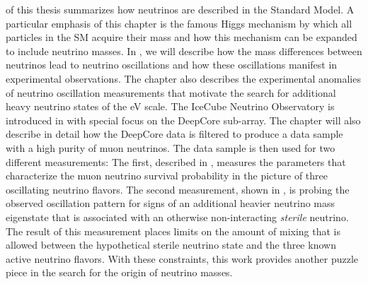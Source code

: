  of this thesis summarizes how neutrinos are described in the Standard Model. A particular emphasis of this chapter is the famous Higgs mechanism by which all particles in the SM acquire their mass and how this mechanism can be expanded to include neutrino masses. In , we will describe how the mass differences between neutrinos lead to neutrino oscillations and how these oscillations manifest in experimental observations. The chapter also describes the experimental anomalies of neutrino oscillation measurements that motivate the search for additional heavy neutrino states of the eV scale. The IceCube Neutrino Observatory is introduced in  with special focus on the DeepCore sub-array. The chapter will also describe in detail how the DeepCore data is filtered to produce a data sample with a high purity of muon neutrinos. The data sample is then used for two different measurements: The first, described in , measures the parameters that characterize the muon neutrino survival probability in the picture of three oscillating neutrino flavors. The second measurement, shown in , is probing the observed oscillation pattern for signs of an additional heavier neutrino mass eigenstate that is associated with an otherwise non-interacting \emph{sterile} neutrino. The result of this measurement places limits on the amount of mixing that is allowed between the hypothetical sterile neutrino state and the three known active neutrino flavors. With these constraints, this work provides another puzzle piece in the search for the origin of neutrino masses.

